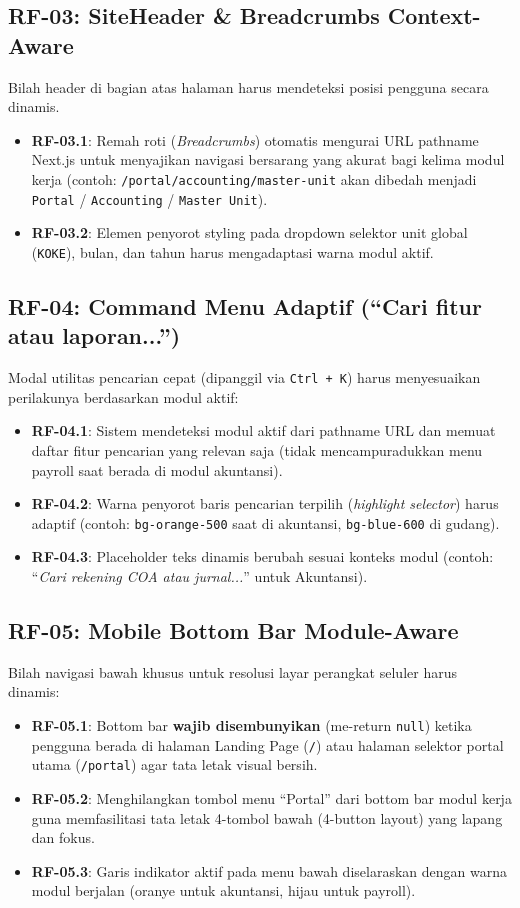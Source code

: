 \documentclass[11pt,a4paper]{article}
\begin{document}
\subsection{RF-03: SiteHeader \& Breadcrumbs Context-Aware}
Bilah header di bagian atas halaman harus mendeteksi posisi pengguna secara dinamis.
\begin{itemize}
    \item \textbf{RF-03.1}: Remah roti (\textit{Breadcrumbs}) otomatis mengurai URL pathname Next.js untuk menyajikan navigasi bersarang yang akurat bagi kelima modul kerja (contoh: \texttt{/portal/accounting/master-unit} akan dibedah menjadi \texttt{Portal} / \texttt{Accounting} / \texttt{Master Unit}).
    \item \textbf{RF-03.2}: Elemen penyorot styling pada dropdown selektor unit global (\texttt{KOKE}), bulan, dan tahun harus mengadaptasi warna modul aktif.
\end{itemize}

\subsection{RF-04: Command Menu Adaptif (``Cari fitur atau laporan...'')}
Modal utilitas pencarian cepat (dipanggil via \texttt{Ctrl + K}) harus menyesuaikan perilakunya berdasarkan modul aktif:
\begin{itemize}
    \item \textbf{RF-04.1}: Sistem mendeteksi modul aktif dari pathname URL dan memuat daftar fitur pencarian yang relevan saja (tidak mencampuradukkan menu payroll saat berada di modul akuntansi).
    \item \textbf{RF-04.2}: Warna penyorot baris pencarian terpilih (\textit{highlight selector}) harus adaptif (contoh: \texttt{bg-orange-500} saat di akuntansi, \texttt{bg-blue-600} di gudang).
    \item \textbf{RF-04.3}: Placeholder teks dinamis berubah sesuai konteks modul (contoh: ``\textit{Cari rekening COA atau jurnal...}'' untuk Akuntansi).
\end{itemize}

\subsection{RF-05: Mobile Bottom Bar Module-Aware}
Bilah navigasi bawah khusus untuk resolusi layar perangkat seluler harus dinamis:
\begin{itemize}
    \item \textbf{RF-05.1}: Bottom bar \textbf{wajib disembunyikan} (me-return \texttt{null}) ketika pengguna berada di halaman Landing Page (\texttt{/}) atau halaman selektor portal utama (\texttt{/portal}) agar tata letak visual bersih.
    \item \textbf{RF-05.2}: Menghilangkan tombol menu ``Portal'' dari bottom bar modul kerja guna memfasilitasi tata letak 4-tombol bawah (4-button layout) yang lapang dan fokus.
    \item \textbf{RF-05.3}: Garis indikator aktif pada menu bawah diselaraskan dengan warna modul berjalan (oranye untuk akuntansi, hijau untuk payroll).
\end{itemize}
\end{document}

